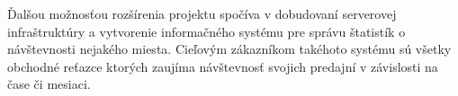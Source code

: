 Ďalšou  možnosťou rozšírenia projektu spočíva v dobudovaní serverovej infraštruktúry a vytvorenie informačného systému pre správu štatistík o návštevnosti nejakého miesta. Cieľovým zákazníkom takéhoto systému sú všetky obchodné reťazce ktorých zaujíma návštevnosť svojich predajní v závislosti na čase či mesiaci.

































